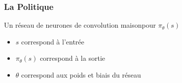 \documentclass[8pt]{beamer}
\begin{document}
\begin{frame}[label=retourCNN]

  \frametitle{La Politique}

  \begin{block}{Un réseau de neurones de convolution maison\footnotemark pour $\pi_{\theta}(s)$}
    \begin{itemize}
    \item $s$ correspond à l'entrée
    \item $\pi_{\theta}(s)$ correspond à la sortie
    \item $\theta$ correspond aux poids et biais du réseau
    \end{itemize}

  \end{block}

  \begin{figure}
    

\end{figure}
\end{frame}
\end{document}
